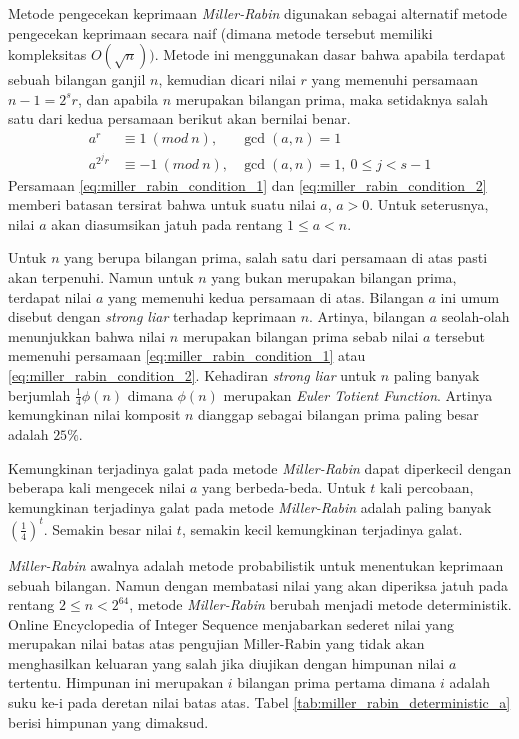 Metode pengecekan keprimaan \textit{Miller-Rabin} digunakan sebagai alternatif metode pengecekan keprimaan secara naif (dimana metode tersebut memiliki kompleksitas $ O(\sqrt{n})) $. Metode ini menggunakan dasar bahwa apabila terdapat sebuah bilangan ganjil $ n $, kemudian dicari nilai $ r $ yang memenuhi persamaan $ n-1=2^{s} r $, dan apabila $ n $ merupakan bilangan prima, maka setidaknya salah satu dari kedua persamaan berikut akan bernilai benar. \cite{hac_publickey}
\begin{align}
\label{eq:miller_rabin_condition_1}
a^r &\equiv 1\ (mod\ n), & \gcd(a,n)=1 \\
\label{eq:miller_rabin_condition_2}
a^{2^j r} &\equiv -1\ (mod\ n), & \gcd(a,n)=1,\ 0 \leq j <s-1
\end{align}
Persamaan \eqref{eq:miller_rabin_condition_1} dan \eqref{eq:miller_rabin_condition_2} memberi batasan tersirat bahwa untuk suatu nilai $ a $, $ a>0 $. Untuk seterusnya, nilai $ a $ akan diasumsikan jatuh pada rentang $ 1 \leq a < n $.

Untuk $ n $ yang berupa bilangan prima, salah satu dari persamaan di atas pasti akan terpenuhi. Namun untuk $ n $ yang bukan merupakan bilangan prima, terdapat nilai $ a $ yang memenuhi kedua persamaan di atas. Bilangan $ a $ ini umum disebut dengan \textit{strong liar} terhadap keprimaan $ n $. Artinya, bilangan $ a $ seolah-olah menunjukkan bahwa nilai $ n $ merupakan bilangan prima sebab nilai $ a $ tersebut memenuhi persamaan \eqref{eq:miller_rabin_condition_1} atau \eqref{eq:miller_rabin_condition_2}. Kehadiran \textit{strong liar} untuk $ n $ paling banyak berjumlah $ \frac{1}{4} \phi(n) $ dimana $ \phi(n) $ merupakan \textit{Euler Totient Function}. Artinya kemungkinan nilai komposit $ n $ dianggap sebagai bilangan prima paling besar adalah $ 25\% $.

Kemungkinan terjadinya galat pada metode \textit{Miller-Rabin} dapat diperkecil dengan beberapa kali mengecek nilai $ a $ yang berbeda-beda. Untuk $ t $ kali percobaan, kemungkinan terjadinya galat pada metode \textit{Miller-Rabin} adalah paling banyak $ (\frac{1}{4})^{t} $. Semakin besar nilai $ t $, semakin kecil kemungkinan terjadinya galat.

\textit{Miller-Rabin} awalnya adalah metode probabilistik untuk menentukan keprimaan sebuah bilangan. Namun dengan membatasi nilai yang akan diperiksa jatuh pada rentang $ 2 \leq n < 2^{64} $, metode \textit{Miller-Rabin} berubah menjadi metode deterministik. Online Encyclopedia of Integer Sequence \cite{oeis_mrabin_limit} menjabarkan sederet nilai yang merupakan nilai batas atas pengujian Miller-Rabin yang tidak akan menghasilkan keluaran yang salah jika diujikan dengan himpunan nilai $ a $ tertentu. Himpunan ini merupakan $ i $ bilangan prima pertama dimana $ i $ adalah suku ke-i pada deretan nilai batas atas. Tabel \ref{tab:miller_rabin_deterministic_a} berisi himpunan yang dimaksud.

